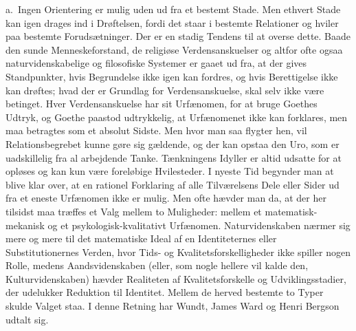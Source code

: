 \documentclass[12pt]{article}
\newcommand{\opage}[1]{\marginnote{\footnotesize\textit{[#1]}}}
\begin{document}
a.~Ingen Orientering er mulig uden ud fra et bestemt Stade. Men ethvert
Stade kan igen drages ind i Drøftelsen, fordi det staar i bestemte
Relationer og hviler paa bestemte Forudsætninger. Der er en stadig Tendens
til at overse dette. Baade den sunde Menneskeforstand, de religiøse
Verdensanskuelser og altfor ofte ogsaa naturvidenskabelige og filosofiske
Systemer er gaaet ud fra, at der gives Standpunkter, hvis Begrundelse ikke
igen kan fordres, og hvis Berettigelse ikke kan drøftes; hvad der er
Grundlag for Verdensanskuelse, skal selv ikke være betinget. Hver
Verdensanskuelse har sit Urfænomen, for at bruge Goethes Udtryk, og Goethe
paastod udtrykkelig, at Urfænomenet ikke kan forklares, men maa betragtes
som et absolut Sidste. Men hvor man saa flygter hen, vil Relationsbegrebet
kunne gøre sig gældende, og der kan opstaa den Uro, som er uadskillelig fra
al arbejdende Tanke. Tænkningens Idyller er altid udsatte for at opløses og
kan kun være foreløbige Hvilesteder. I nyeste Tid begynder man at blive
klar over, at en rationel Forklaring af alle Tilværelsens Dele eller Sider
ud fra et eneste Urfænomen ikke er mulig. Men ofte hævder man da, at der
her tilsidst maa træffes et Valg mellem to Muligheder: mellem et
matematisk-mekanisk og et psykologisk-kvalitativt Urfænomen.
Naturvidenskaben nærmer sig mere og mere til det matematiske Ideal af en
Identiteternes eller Substitutionernes Verden, hvor Tids- og
\opage{100} \setcounter{footnote}{0}
Kvalitetsforskelligheder ikke spiller nogen Rolle, medens Aandsvidenskaben
(eller, som nogle hellere vil kalde den, Kulturvidenskaben) hævder
Realiteten af Kvalitetsforskelle og Udviklingsstadier, der udelukker
Reduktion til Identitet. Mellem de herved bestemte to Typer skulde Valget
staa. I denne Retning har Wundt, James Ward og Henri Bergson udtalt sig.
\end{document}
